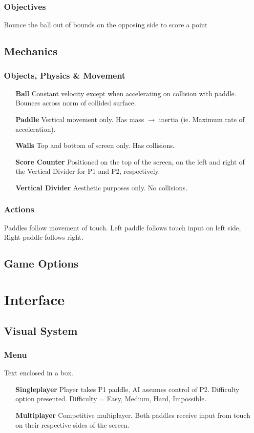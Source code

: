 \documentclass[12pt, letterpaper]{article}
\begin{document}
        \subsubsection{Objectives}
        Bounce the ball out of bounds on the opposing side to score a point
    \subsection{Mechanics}
        \subsubsection{Objects, Physics \& Movement}
        \begin{itemize}
            \item[\textbf{Ball}] Constant velocity except when accelerating on collision with paddle. Bounces across norm of collided surface.
            \item[\textbf{Paddle}] Vertical movement only. Has mass $\rightarrow$ inertia (ie. Maximum rate of acceleration).
            \item[\textbf{Walls}] Top and bottom of screen only. Has collisions.
            \item[\textbf{Score Counter}] Positioned on the top of the screen, on the left and right of the Vertical Divider for P1 and P2, respectively.
            \item[\textbf{Vertical Divider}] Aesthetic purposes only. No collisions. 
        \end{itemize}
        \subsubsection{Actions}
        Paddles follow movement of touch. Left paddle follows touch input on left side, Right paddle follows right.
    \subsection{Game Options}
\section{Interface}
    \subsection{Visual System}
        \subsubsection{Menu}
        Text enclosed in a box.
        \begin{itemize}
            \item[\textbf{Singleplayer}] Player takes P1 paddle, AI assumes control of P2. Difficulty option presented. Difficulty = Easy, Medium, Hard, Impossible.
            \item[\textbf{Multiplayer}] Competitive multiplayer. Both paddles receive input from touch on their respective sides of the screen.
        \end{itemize}
\end{document}
